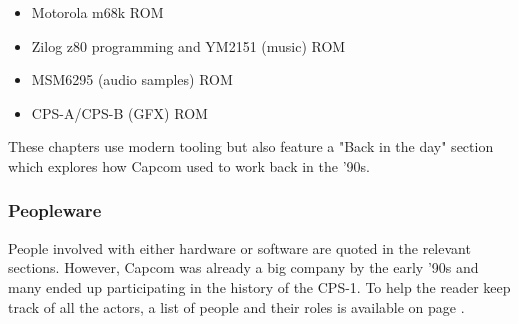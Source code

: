 \begin{itemize}[topsep=0pt]
\item Motorola m68k ROM
\item Zilog z80 programming and YM2151 (music) ROM
\item MSM6295 (audio samples) ROM
\item CPS-A/CPS-B (GFX) ROM
\end{itemize}

These chapters use modern tooling but also feature a "Back in the day" section which explores how Capcom used to work back in the '90s.

\subsubsection{Peopleware}
People involved with either hardware or software are quoted in the relevant sections. However, Capcom was already a big company by the early '90s and many ended up participating in the history of the CPS-1. To help the reader keep track of all the actors, a list of people and their roles is available on page \pageref{people}.
